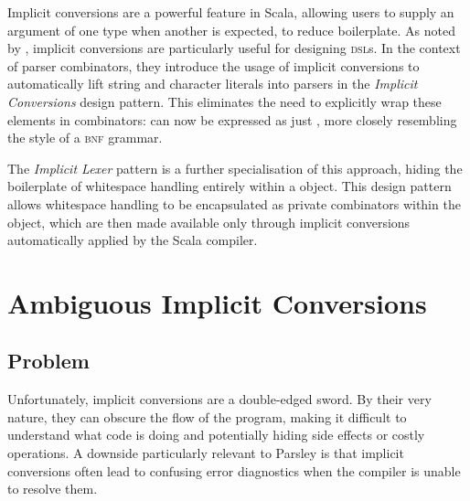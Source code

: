 \documentclass[../../main.tex]{subfiles}
\begin{document}

\label{sec:simple-rules}
Implicit conversions are a powerful feature in Scala, allowing users to supply an argument of one type when another is expected, to reduce boilerplate.
As noted by \textcite{willis_design_2022}, implicit conversions are particularly useful for designing \textsc{dsl}s.
In the context of parser combinators, they introduce the usage of implicit conversions to automatically lift string and character literals into parsers in the \emph{Implicit Conversions} design pattern.
This eliminates the need to explicitly wrap these elements in combinators:
 can now be expressed as just , more closely resembling the style of a \textsc{bnf} grammar.

The \emph{Implicit Lexer} pattern is a further specialisation of this approach, hiding the boilerplate of whitespace handling entirely within a  object.
This design pattern allows whitespace handling to be encapsulated as private combinators within the  object, which are then made available only through implicit conversions automatically applied by the Scala compiler.


\section{Ambiguous Implicit Conversions}
\subsection{Problem}
Unfortunately, implicit conversions are a double-edged sword.
By their very nature, they can obscure the flow of the program, making it difficult to understand what code is doing and potentially hiding side effects or costly operations.
A downside particularly relevant to Parsley is that implicit conversions often lead to confusing error diagnostics when the compiler is unable to resolve them.
\end{document}

